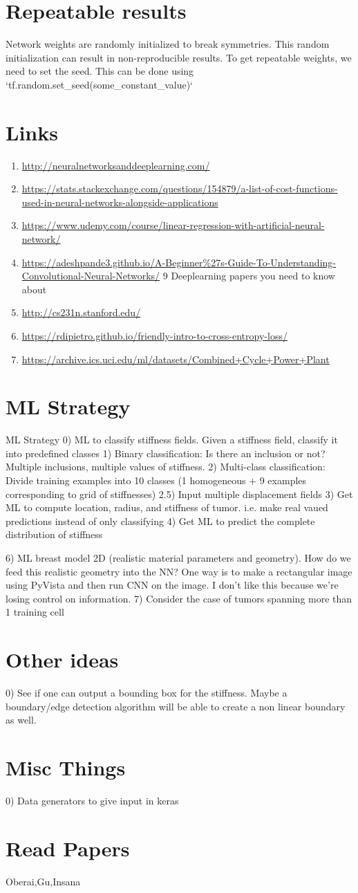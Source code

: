 \documentclass{article}
\begin{document}
\section{Repeatable results}
Network weights are randomly initialized to break symmetries. This random initialization can result in non-reproducible results. To get repeatable weights, we need to set the seed. This can be done using `tf.random.set\_seed(some\_constant\_value)`
\section{Links}
\begin{enumerate}
\item{\url{http://neuralnetworksanddeeplearning.com/}}
\item{\url{https://stats.stackexchange.com/questions/154879/a-list-of-cost-functions-used-in-neural-networks-alongside-applications}}
\item{\url{https://www.udemy.com/course/linear-regression-with-artificial-neural-network/}}
\item{\url{https://adeshpande3.github.io/A-Beginner%27s-Guide-To-Understanding-Convolutional-Neural-Networks/} 9 Deeplearning  papers you need to know about}
\item{\url{http://cs231n.stanford.edu/} }
\item{\url{https://rdipietro.github.io/friendly-intro-to-cross-entropy-loss/}}
\item{\url{https://archive.ics.uci.edu/ml/datasets/Combined+Cycle+Power+Plant}}
\end{enumerate}
\section{ML Strategy}
ML Strategy
0) ML to classify stiffness fields. Given a stiffness field, classify it into predefined classes
1) Binary classification: Is there an inclusion or not? Multiple inclusions, multiple values of stiffness. 
2) Multi-class classification: Divide training examples into 10 classes (1 homogeneous + 9 examples corresponding to grid of stiffnesses)
2.5) Input multiple displacement fields
3) Get ML to compute location, radius, and stiffness of tumor. i.e. make real vaued predictions instead of only classifying
4) Get ML to predict the complete distribution of stiffness

6) ML breast model 2D (realistic material parameters and geometry). How do we feed this realistic geometry into the NN? One way is to make a rectangular image using PyVista and then run CNN on the image. I don't like this because we're losing control on information.  
7) Consider the case of tumors spanning more than 1 training cell
\section{Other ideas}
0) See if one can output a bounding box for the stiffness. Maybe a boundary/edge detection algorithm will be able to create a non linear boundary as well.
\section{Misc Things}
0) Data generators to give input in keras
\section{Read Papers}
\item{Oberai,Gu,Insana}
\end{document}
